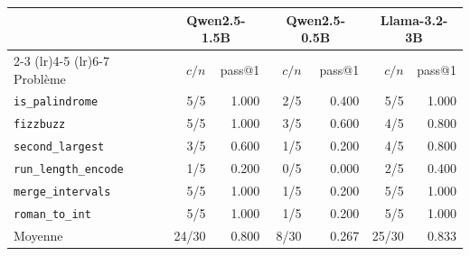 \begin{tabular}{lrrrrrr}
\toprule
 & \multicolumn{2}{c}{Qwen2.5-1.5B} & \multicolumn{2}{c}{Qwen2.5-0.5B} & \multicolumn{2}{c}{Llama-3.2-3B} \\
\cmidrule(lr){2-3}
\cmidrule(lr){4-5}
\cmidrule(lr){6-7}
Problème & $c/n$ & pass@1 & $c/n$ & pass@1 & $c/n$ & pass@1 \\
\midrule
\texttt{is\_palindrome} & 5/5 & 1.000 & 2/5 & 0.400 & 5/5 & 1.000 \\
\texttt{fizzbuzz} & 5/5 & 1.000 & 3/5 & 0.600 & 4/5 & 0.800 \\
\texttt{second\_largest} & 3/5 & 0.600 & 1/5 & 0.200 & 4/5 & 0.800 \\
\texttt{run\_length\_encode} & 1/5 & 0.200 & 0/5 & 0.000 & 2/5 & 0.400 \\
\texttt{merge\_intervals} & 5/5 & 1.000 & 1/5 & 0.200 & 5/5 & 1.000 \\
\texttt{roman\_to\_int} & 5/5 & 1.000 & 1/5 & 0.200 & 5/5 & 1.000 \\
Moyenne & 24/30 & 0.800 & 8/30 & 0.267 & 25/30 & 0.833 \\
\bottomrule
\end{tabular}
